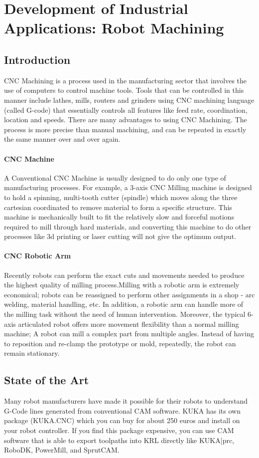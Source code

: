 \section{Development of Industrial Applications: Robot Machining}
\subsection{Introduction}
CNC Machining is a process used in the manufacturing sector that involves the use of computers to control machine tools. Tools that can be controlled in this manner include lathes, mills, routers and grinders using CNC machining language (called G-code) that essentially controls all features like feed rate, coordination, location and speeds. There are many advantages to using CNC Machining. The process is more precise than manual machining, and can be repeated in exactly the same manner over and over again.
\paragraph{CNC Machine} A Conventional CNC Machine is usually designed to do only one type of manufacturing processes. For example, a 3-axis CNC Milling machine is designed to hold a spinning, multi-tooth cutter (spindle) which moves along the three cartesian coordinated to remove material to form a specific structure. This machine is mechanically built to fit the relatively slow and forceful motions required to mill through hard materials, and converting this machine to do other processes like 3d printing or laser cutting will not give the optimum output.
\paragraph{CNC Robotic Arm } Recently robots can perform the exact cuts and movements needed to produce the highest quality of milling process.Milling with a robotic arm is extremely economical; robots can be reassigned to perform other assignments in a shop - arc welding, material handling, etc. In addition, a robotic arm can handle more of the milling task without the need of human intervention. Moreover, the typical 6-axis articulated robot offers more movement flexibility than a normal milling machine; A robot can mill a complex part from multiple angles. Instead of having to reposition and re-clamp the prototype or mold, repeatedly, the robot can remain stationary. 
\subsection{State of the Art}
Many robot manufacturers have made it possible for their robots to understand G-Code lines generated from conventional CAM software. KUKA has its own package (KUKA.CNC) which you can buy for about 250 euros and install on your robot controller. If you find this package expensive, you can use CAM software that is able to export toolpaths into KRL directly like KUKA|prc, RoboDK, PowerMill, and  SprutCAM.
\vspace{.5cm}
